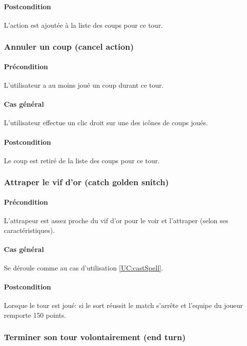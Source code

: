    \paragraph{Postcondition} L'action est ajoutée à la liste des coups pour ce tour.

\subsubsection{Annuler un coup (cancel action)}
    \paragraph{Précondition} L'utilisateur a au moins joué un coup durant ce \gls{tour}.
    \paragraph{Cas général} L'utilisateur effectue un clic droit sur une des icônes de coups joués.
    \paragraph{Postcondition} Le coup est retiré de la liste des coups pour ce tour.

\subsubsection{Attraper le vif d'or (catch golden snitch)}
    \paragraph{Précondition} L'attrapeur est assez proche du vif d'or pour le voir et l'attraper (selon ses caractéristiques).
    \paragraph{Cas général} Se déroule comme au cas d'utilisation \ref{UC:castSpell}.
    \paragraph{Postcondition} Lorsque le tour est joué: si le sort réussit le match s'arrête et l'\gls{equipe} du joueur remporte 150 points.

\subsubsection{Terminer son tour volontairement (end turn)}
